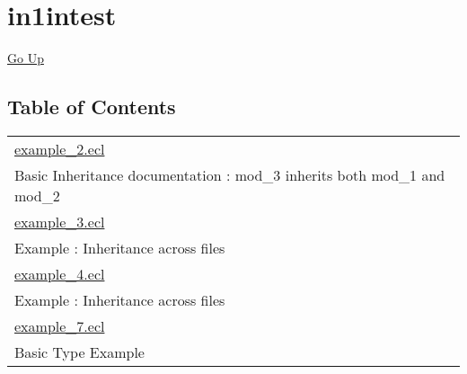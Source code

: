 \chapter*{\color{headtoc} in1intest}
\hypertarget{ecldoc:toc:root/intest/in1intest}{}
\hyperlink{ecldoc:toc:root/intest}{Go Up}


\section*{Table of Contents}
{\renewcommand{\arraystretch}{1.5}
\begin{longtable}{|p{\textwidth}|}
\hline
\hyperlink{ecldoc:toc:intest.in1intest.example_2}{example\_2.ecl} \\
Basic Inheritance documentation : mod\_3 inherits both mod\_1 and mod\_2 \\
\hline
\hyperlink{ecldoc:toc:intest.in1intest.example_3}{example\_3.ecl} \\
Example : Inheritance across files \\
\hline
\hyperlink{ecldoc:toc:intest.in1intest.example_4}{example\_4.ecl} \\
Example : Inheritance across files \\
\hline
\hyperlink{ecldoc:toc:intest.in1intest.example_7}{example\_7.ecl} \\
Basic Type Example \\
\hline
\end{longtable}
}





